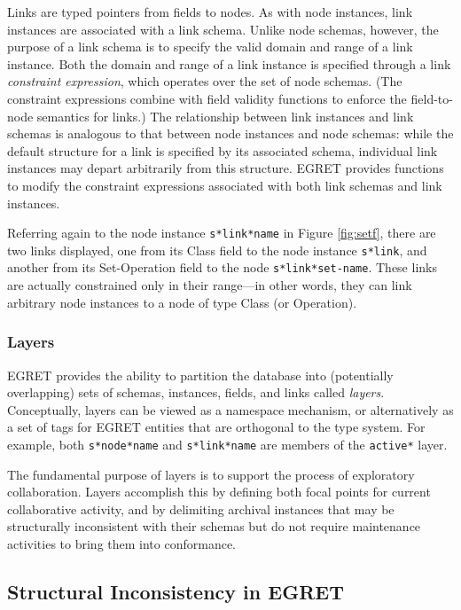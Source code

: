 Links are typed pointers from fields to nodes. As with node instances, link instances are associated with a link schema. Unlike node schemas, however, the purpose of a link schema is to specify the valid domain and range of a link instance.  Both the domain and range of a link instance is specified through a link {\em constraint expression}, which operates over the set of node schemas.  (The constraint expressions combine with field validity functions to enforce the field-to-node semantics for links.)  The relationship between link instances and link schemas is analogous to that between node instances and node schemas: while the default structure for a link is specified by its associated schema, individual link instances may depart arbitrarily from this structure. EGRET provides functions to modify the constraint expressions associated with both link schemas and link instances.

Referring again to the node instance {\tt s*link*name} in Figure \ref{fig:setf}, there are two links displayed, one from its Class field to the node instance {\tt s*link}, and another from its Set-Operation field to the node {\tt s*link*set-name}. These links are actually constrained only in their range---in other words, they can link arbitrary node instances to a node of type Class (or Operation).

\subsubsection{Layers}

EGRET provides the ability to partition the database into (potentially overlapping) sets of schemas, instances, fields, and links called {\em layers}. Conceptually, layers can be viewed as a namespace mechanism, or alternatively as a set of tags for EGRET entities that are orthogonal to the type system.  For example, both {\tt s*node*name} and {\tt s*link*name} are members of the {\tt *active*} layer.

The fundamental purpose of layers is to support the process of exploratory collaboration.  Layers accomplish this by defining both focal points for current collaborative activity, and by delimiting archival instances that may be structurally inconsistent with their schemas but do not require maintenance activities to bring them into conformance.

\subsection{Structural Inconsistency in EGRET}

